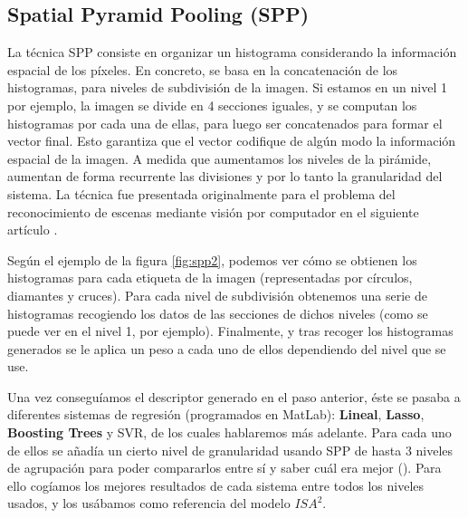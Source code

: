 \subsection{Spatial Pyramid Pooling (SPP)}


La técnica \ac{SPP} consiste en organizar un histograma considerando la información espacial de los píxeles. En concreto, se basa en la concatenación de los histogramas, para niveles de subdivisión de la imagen. Si estamos en un nivel 1 por ejemplo, la imagen se divide en 4 secciones iguales, y se computan los histogramas por cada una de ellas, para luego ser concatenados para formar el vector final. Esto garantiza que el vector codifique de algún modo la información espacial de la imagen. A medida que aumentamos los niveles de la pirámide, aumentan de forma recurrente las divisiones y por lo tanto la granularidad del sistema. La técnica fue presentada originalmente para el problema del reconocimiento de escenas mediante visión por computador en el siguiente artículo \cite{spp_real}.


Según el ejemplo de la figura \ref{fig:spp2}, podemos ver cómo se obtienen los histogramas para cada etiqueta de la imagen (representadas por círculos, diamantes y cruces). Para cada nivel de subdivisión obtenemos una serie de histogramas recogiendo los datos de las secciones de dichos niveles (como se puede ver en el nivel 1, por ejemplo). Finalmente, y tras recoger los histogramas generados se le aplica un peso a cada uno de ellos dependiendo del nivel que se use.

Una vez conseguíamos el descriptor generado en el paso anterior, éste se pasaba a diferentes sistemas de regresión (programados en MatLab): \textbf{Lineal}, \textbf{Lasso}, \textbf{Boosting Trees} y \ac{SVR}, de los cuales hablaremos más adelante. Para cada uno de ellos se añadía un cierto nivel de granularidad usando \ac{SPP} de hasta 3 niveles de agrupación para poder compararlos entre sí y saber cuál era mejor (\cite{isa2}). Para ello cogíamos los mejores resultados de cada sistema entre todos los niveles usados, y los usábamos como referencia del modelo $ISA^{2}$.

